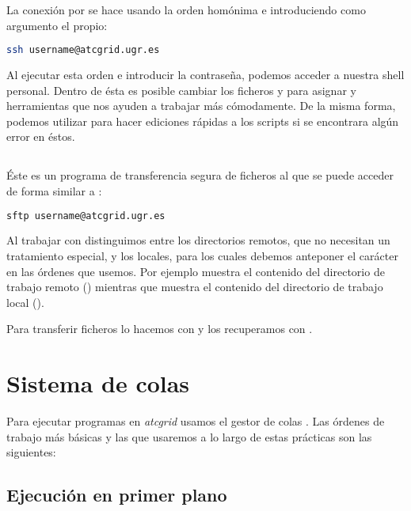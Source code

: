 La conexión por  se hace usando la orden homónima e introduciendo como argumento el  propio:

\begin{lstlisting}[language=sh]
ssh username@atcgrid.ugr.es
\end{lstlisting}

Al ejecutar esta orden e introducir la contraseña, podemos acceder a nuestra shell personal.
Dentro de ésta es posible cambiar los ficheros  y  para asignar  y herramientas que nos ayuden a trabajar más cómodamente.
De la misma forma, podemos utilizar  para hacer ediciones rápidas a los scripts si se encontrara algún error en éstos.

\subsection{}

Éste es un programa de transferencia segura de ficheros al que se puede acceder de forma similar a :

\begin{lstlisting}[language=sh]
sftp username@atcgrid.ugr.es
\end{lstlisting}

Al trabajar con  distinguimos entre los directorios remotos, que no necesitan un tratamiento especial, y los locales, para los cuales debemos anteponer el carácter  en las órdenes que usemos.
Por ejemplo  muestra el contenido del directorio de trabajo remoto () mientras que  muestra el contenido del directorio de trabajo local ().

Para transferir ficheros lo hacemos con  y los recuperamos con .

\section{Sistema de colas}

Para ejecutar programas en \textit{atcgrid} usamos el gestor de colas \href{https://slurm.schedmd.com/pdfs/summary.pdf}{}.
Las órdenes de trabajo más básicas y las que usaremos a lo largo de estas prácticas son las siguientes:

\subsection{Ejecución en primer plano}

